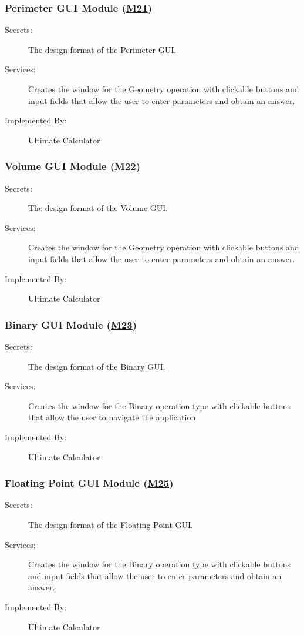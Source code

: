 \documentclass[12pt, titlepage]{article}
\begin{document}
\subsubsection{Perimeter GUI Module (\hyperref[m21]{M21})}
\begin{description}
\item[Secrets:]The design format of the Perimeter GUI.
\item[Services:] Creates the window for the Geometry operation with clickable buttons and input fields that allow the user to enter parameters and obtain an answer.
\item[Implemented By:] Ultimate Calculator
\end{description}

\subsubsection{Volume GUI Module (\hyperref[m22]{M22})}
\begin{description}
\item[Secrets:]The design format of the Volume GUI.
\item[Services:] Creates the window for the Geometry operation with clickable buttons and input fields that allow the user to enter parameters and obtain an answer.
\item[Implemented By:] Ultimate Calculator
\end{description}

\subsubsection{Binary GUI Module (\hyperref[m23]{M23})}
\begin{description}
\item[Secrets:]The design format of the Binary GUI.
\item[Services:] Creates the window for the Binary operation type with clickable buttons that allow the user to navigate the application.
\item[Implemented By:] Ultimate Calculator
\end{description}

\subsubsection{Floating Point GUI Module (\hyperref[m25]{M25})}
\begin{description}
\item[Secrets:]The design format of the Floating Point GUI.
\item[Services:] Creates the window for the Binary operation type with clickable buttons and input fields that allow the user to enter parameters and obtain an answer.
\item[Implemented By:] Ultimate Calculator
\end{description}
\end{document}
